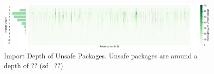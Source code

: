 \begin{figure}[!t]
    \centering
    \includegraphics[width=\textwidth]{assets/plots/chapter4/unsafe-import-depth.pdf}
    \caption{Import Depth of Unsafe Packages. Unsafe packages are around a depth of ?? (sd=??)}
    \label{fig:unsafe-import-depth}
\end{figure}
